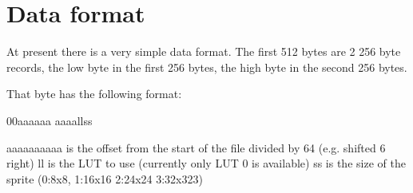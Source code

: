 \section{Data format}

At present there is a very simple data format. The first 512 bytes are 2 256 byte records, the low byte in the first 256 bytes, the high byte in the second 256 bytes.

That byte has the following format:

00aaaaaa aaaallss

aaaaaaaaaa is the offset from the start of the file divided by 64 (e.g. shifted 6 right)
ll is the LUT to use (currently only LUT 0 is available)
ss is the size of the sprite (0:8x8, 1:16x16 2:24x24 3:32x323)
